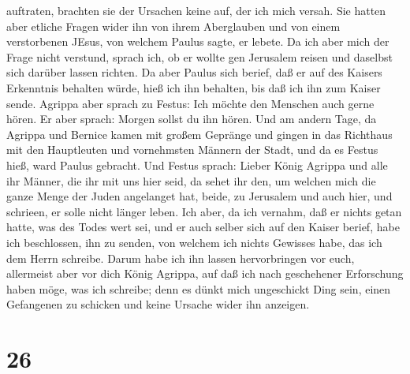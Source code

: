 auftraten, brachten sie der Ursachen keine auf, der ich mich versah.
 Sie hatten aber etliche Fragen wider ihn von ihrem
Aberglauben und von einem verstorbenen JEsus, von welchem Paulus sagte,
er lebete.  Da ich aber mich der Frage nicht verstund,
sprach ich, ob er wollte gen Jerusalem reisen und daselbst sich darüber
lassen richten.  Da aber Paulus sich berief, daß er auf des
Kaisers Erkenntnis behalten würde, hieß ich ihn behalten, bis daß ich
ihn zum Kaiser sende.  Agrippa aber sprach zu Festus: Ich
möchte den Menschen auch gerne hören. Er aber sprach: Morgen sollst du
ihn hören.  Und am andern Tage, da Agrippa und Bernice
kamen mit großem Gepränge und gingen in das Richthaus mit den
Hauptleuten und vornehmsten Männern der Stadt, und da es Festus hieß,
ward Paulus gebracht.  Und Festus sprach: Lieber König
Agrippa und alle ihr Männer, die ihr mit uns hier seid, da sehet ihr
den, um welchen mich die ganze Menge der Juden angelanget hat, beide, zu
Jerusalem und auch hier, und schrieen, er solle nicht länger leben.
 Ich aber, da ich vernahm, daß er nichts getan hatte, was
des Todes wert sei, und er auch selber sich auf den Kaiser berief, habe
ich beschlossen, ihn zu senden,  von welchem ich nichts
Gewisses habe, das ich dem Herrn schreibe. Darum habe ich ihn lassen
hervorbringen vor euch, allermeist aber vor dich König Agrippa, auf daß
ich nach geschehener Erforschung haben möge, was ich schreibe;
 denn es dünkt mich ungeschickt Ding sein, einen Gefangenen
zu schicken und keine Ursache wider ihn anzeigen.

\hypertarget{section-25}{%
\section{26}\label{section-25}}

